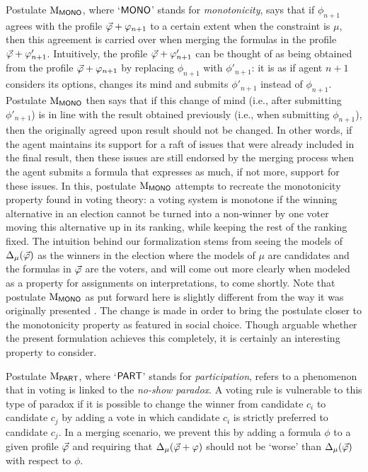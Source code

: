 Postulate $\ppm{\MONO}$, where `$\MONO$' stands for \emph{monotonicity},
says that if $\phi_{n+1}$ agrees with the profile $\P+\phi_{n+1}$ 
to a certain extent when the constraint is $\mu$,
then this agreement is carried over when merging the formulas in the profile $\P+\phi'_{n+1}$.
Intuitively, the profile $\P+\phi'_{n+1}$ can be thought of as being obtained from 
the profile $\P+\phi_{n+1}$ by replacing $\phi_{n+1}$ with $\phi'_{n+1}$:
it is as if agent $n+1$ considers its options, 
changes its mind and submits $\phi'_{n+1}$ instead of $\phi_{n+1}$.
Postulate $\ppm{\MONO}$ then says that if this change of mind
(i.e., after submitting $\phi'_{n+1}$)
is in line with the 
result obtained previously
(i.e., when submitting $\phi_{n+1}$), then the originally agreed upon result 
should not be changed. 
In other words, if the agent maintains its support 
for a raft of issues that were already included 
in the final result, then these issues are still endorsed
by the merging process
when the agent submits a formula that expresses as much, if not more, 
support for these issues.
In this, postulate $\ppm{\MONO}$ attempts to recreate the monotonicity property 
found in voting theory:
a voting system is monotone if the winning alternative in an election cannot be 
turned into a non-winner by one voter moving this alternative up in its ranking, 
while keeping the rest of the ranking fixed.
The intuition behind our formalization stems from seeing the models of 
$\me_\mu(\P)$ as the winners in the election where the models of $\mu$ 
are candidates and the formulas in $\P$ are the voters,
and will come out more clearly when modeled 
as a property for assignments on interpretations,
to come shortly.
Note that postulate $\ppm{\MONO}$ as put forward here is slightly 
different from the way it was originally presented \cite{HaretPW16}.
The change is made in order to bring the postulate closer to the monotonicity
property as featured in social choice. Though arguable whether the present formulation
achieves this completely, it is certainly an interesting property to consider.

Postulate $\ppm{\PART}$, where `$\PART$' stands for \emph{participation},
refers to a phenomenon that in voting is linked to the \textit{no-show paradox}.
A voting rule is vulnerable to this type of paradox
if it is possible to change the winner from candidate $c_i$ to candidate $c_j$ 
by adding a vote in which candidate $c_i$ is strictly preferred to candidate $c_j$.
In a merging scenario, we prevent this by adding a formula $\phi$ to a given profile $\P$ and
requiring that $\me_{\mu}(\P+\phi)$ should not be `worse' than $\me_\mu(\P)$ with respect to $\phi$.

